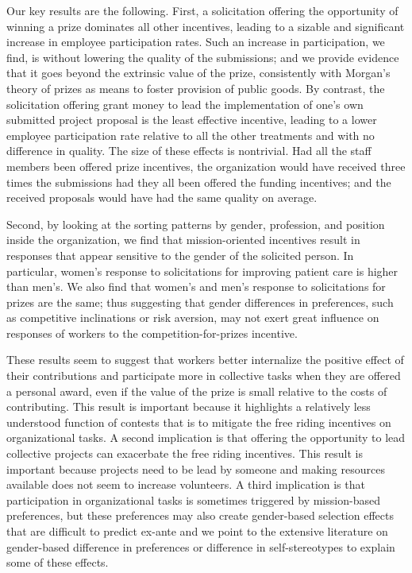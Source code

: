 \documentclass[11pt]{article}
\begin{document}
Our key results are the following. First, a solicitation offering the
opportunity of winning a prize dominates all other incentives, leading
to a sizable and significant increase in employee participation rates.
Such an increase in participation, we find, is without lowering the
quality of the submissions; and we provide evidence that it goes beyond
the extrinsic value of the prize, consistently with Morgan's theory of
prizes as means to foster provision of public goods. By contrast, the
solicitation offering grant money to lead the implementation of one's
own submitted project proposal is the least effective incentive, leading
to a lower employee participation rate relative to all the other
treatments and with no difference in quality. The size of these effects
is nontrivial. Had all the staff members been offered prize incentives,
the organization would have received three times the submissions had
they all been offered the funding incentives; and the received proposals
would have had the same quality on average.

Second, by looking at the sorting patterns by gender, profession, and
position inside the organization, we find that mission-oriented
incentives result in responses that appear sensitive to the gender of
the solicited person. In particular, women's response to solicitations
for improving patient care is higher than men's. We also find that
women's and men's response to solicitations for prizes are the same;
thus suggesting that gender differences in preferences, such as
competitive inclinations or risk aversion, may not exert great influence
on responses of workers to the competition-for-prizes incentive.

These results seem to suggest that workers better internalize the
positive effect of their contributions and participate more in
collective tasks when they are offered a personal award, even if the
value of the prize is small relative to the costs of contributing. This
result is important because it highlights a relatively less understood
function of contests that is to mitigate the free riding incentives on
organizational tasks. A second implication is that offering the
opportunity to lead collective projects can exacerbate the free riding
incentives. This result is important because projects need to be lead by
someone and making resources available does not seem to increase
volunteers. A third implication is that participation in organizational
tasks is sometimes triggered by mission-based preferences, but these
preferences may also create gender-based selection effects that are
difficult to predict ex-ante and we point to the extensive literature on
gender-based difference in preferences \citep[see][ for a
review]{croson2009gender} or difference in self-stereotypes
\citep{coffman2014evidence} to explain some of these effects.
\end{document}
